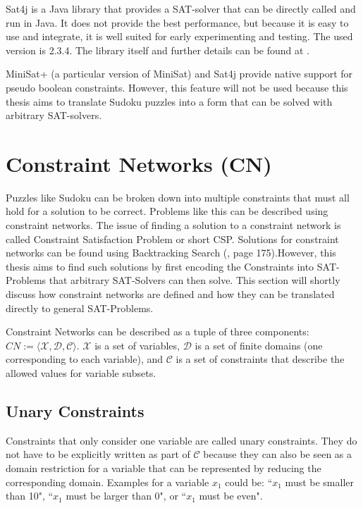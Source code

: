 Sat4j is a Java library that provides a SAT-solver that can be directly called and run in Java. It does not provide the best performance, but because it is easy to use and integrate, it is well suited for early experimenting and testing. The used version is 2.3.4. The library itself and further details can be found at \cite{webSat4j}.

MiniSat+ (a particular version of MiniSat) and Sat4j provide native support for pseudo boolean constraints. However, this feature will not be used because this thesis aims to translate Sudoku puzzles into a form that can be solved with arbitrary SAT-solvers.

\section{Constraint Networks (CN)}
Puzzles like Sudoku can be broken down into multiple constraints that must all hold for a solution to be correct. Problems like this can be described using constraint networks. The issue of finding a solution to a constraint network is called Constraint Satisfaction Problem or short CSP. Solutions for constraint networks can be found using Backtracking Search (\cite{ArtificialAModernApproach}, page 175).However, this thesis aims to find such solutions by first encoding the Constraints into SAT-Problems that arbitrary SAT-Solvers can then solve. This section will shortly discuss how constraint networks are defined and how they can be translated directly to general SAT-Problems.


Constraint Networks can be described as a tuple of three components: $CN := \langle \mathcal{X},  \mathcal{D},  \mathcal{C}\rangle$.
$\mathcal{X}$ is a set of variables, $\mathcal{D}$ is a set of finite domains (one corresponding to each variable), and $\mathcal{C}$ is a set of constraints that describe the allowed values for variable subsets.

\subsection{Unary Constraints}
Constraints that only consider one variable are called unary constraints. They do not have to be explicitly written as part of $\mathcal{C}$ because they can also be seen as a domain restriction for a variable that can be represented by reducing the corresponding domain. Examples for a variable $x_1$ could be: ``$x_1$ must be smaller than 10", ``$x_1$ must be larger than 0", or ``$x_1$ must be even".

